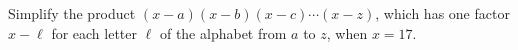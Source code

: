 Simplify the product $(x-a)(x-b)(x-c)\cdots(x-z)$, which has one factor $x-\ell$ for each letter $\ell$ of the alphabet from $a$ to $z$, when $x=17$.

